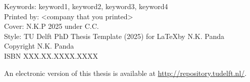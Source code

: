 \begin{titlepage}
Keywords: keyword1, keyword2, keyword3, keyword4\\
Printed by: <company that you printed>\\
Cover: N.K.P 2025 under C.C.  \\ %
Style: TU Delft PhD Thesis Template (2025) for \LaTeX by N.K. Panda \\
Copyright  N.K. Panda \\ %
ISBN XXX.XX.XXXX.XXXX

\bigskip
\bigskip

An electronic version of this thesis is available at \url{http://repository.tudelft.nl/}.

\end{titlepage}



